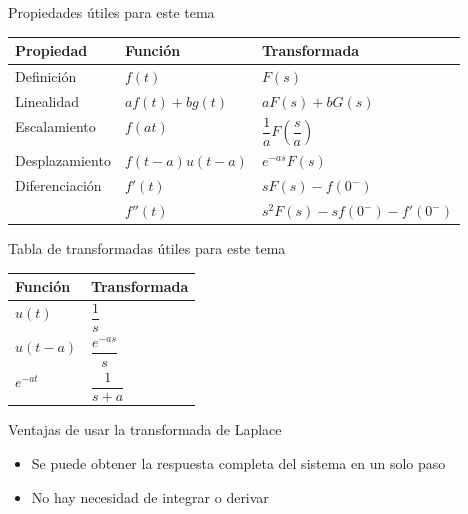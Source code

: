 \documentclass[aspectratio=169]{beamer}
\begin{document}
\begin{frame}{Propiedades útiles para este tema}
    \begin{tabularx}{\textwidth}{p{3cm}XX}
        \toprule
        Propiedad & Función & Transformada\\
        \midrule
        Definición & $f(t)$ & $F(s)$\\[12pt]
        Linealidad & $af(t)+bg(t)$ & $aF(s)+bG(s)$\\[12pt]
        Escalamiento & $f(at)$ & $\dfrac{1}{a}F\left(\dfrac{s}{a}\right)$\\[12pt]
        Desplazamiento & $f(t-a)u(t-a)$ & $e^{-as}F(s)$ \\[12pt]
        Diferenciación & $f'(t)$ & $sF(s)-f(0^-)$\\[12pt]
        & $f''(t)$ & $s^2F(s)-sf(0^-)-f'(0^-)$\\[12pt]
        \bottomrule
    \end{tabularx}
\end{frame}

\begin{frame}{Tabla de transformadas útiles para este tema}
    \centering
    \begin{tabularx}{0.6\textwidth}{XX}
        \toprule
        Función & Transformada\\
        \midrule
        $u(t)$ & $\dfrac{1}{s}$\\[12pt]
        $u(t-a)$ & $\dfrac{e^{-as}}{s}$\\[12pt]
        $e^{-at}$ & $\dfrac{1}{s+a}$\\[12pt]
        \bottomrule
    \end{tabularx}
\end{frame}

\begin{frame}{Ventajas de usar la transformada de Laplace}
\begin{itemize}
    \item Se puede obtener la respuesta completa del sistema en un solo paso
    \item No hay necesidad de integrar o derivar
\end{itemize}

\end{frame}


% 

% 

\end{document}
